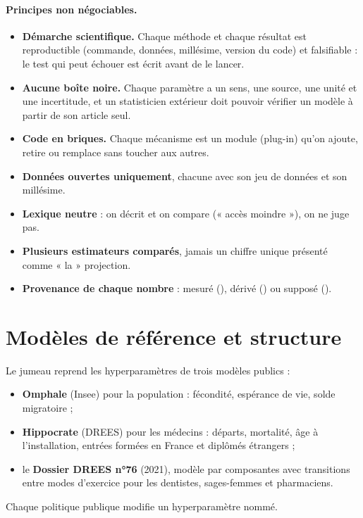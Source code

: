 \paragraph{Principes non négociables.}
\begin{itemize}
  \item \textbf{Démarche scientifique.} Chaque méthode et chaque résultat est reproductible
        (commande, données, millésime, version du code) et falsifiable : le test qui peut
        échouer est écrit avant de le lancer.
  \item \textbf{Aucune boîte noire.} Chaque paramètre a un sens, une source, une unité et une
        incertitude, et un statisticien extérieur doit pouvoir vérifier un modèle à partir de
        son article seul.
  \item \textbf{Code en briques.} Chaque mécanisme est un module (plug-in) qu'on ajoute,
        retire ou remplace sans toucher aux autres.
  \item \textbf{Données ouvertes uniquement}, chacune avec son jeu de données et son
        millésime.
  \item \textbf{Lexique neutre} : on décrit et on compare (« accès moindre »), on ne juge pas.
  \item \textbf{Plusieurs estimateurs comparés}, jamais un chiffre unique présenté comme
        « la » projection.
  \item \textbf{Provenance de chaque nombre} : mesuré (\mesure), dérivé (\derive) ou supposé
        (\suppose).
\end{itemize}

\section{Modèles de référence et structure}
Le jumeau reprend les hyperparamètres de trois modèles publics :
\begin{itemize}
  \item \textbf{Omphale} (Insee) pour la population : fécondité, espérance de vie, solde
        migratoire ;
  \item \textbf{Hippocrate} (DREES) pour les médecins : départs, mortalité, âge à
        l'installation, entrées formées en France et diplômés étrangers ;
  \item le \textbf{Dossier DREES n°76} (2021), modèle par composantes avec transitions entre
        modes d'exercice pour les dentistes, sages-femmes et pharmaciens.
\end{itemize}
Chaque politique publique modifie un hyperparamètre nommé.

